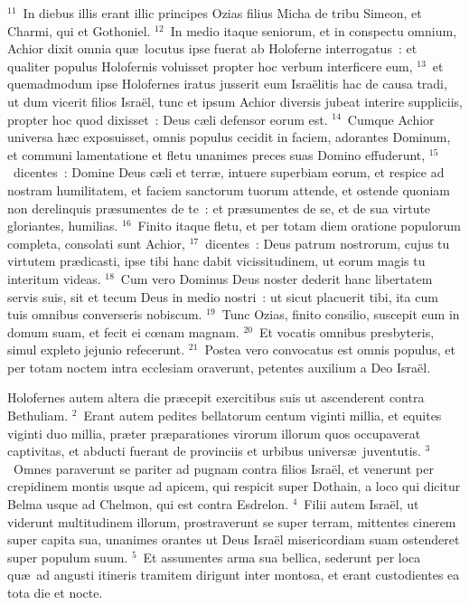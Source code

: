 ${}^{11}$~In diebus illis erant illic principes Ozias filius Micha de tribu Simeon, et Charmi, qui et Gothoniel.
${}^{12}$~In medio itaque seniorum, et in conspectu omnium, Achior dixit omnia qu\ae\ locutus ipse fuerat ab Holoferne interrogatus~: et qualiter populus Holofernis voluisset propter hoc verbum interficere eum,
${}^{13}$~et quemadmodum ipse Holofernes iratus jusserit eum Isra\"elitis hac de causa tradi, ut dum vicerit filios Isra\"el, tunc et ipsum Achior diversis jubeat interire suppliciis, propter hoc quod dixisset~: Deus c\ae li defensor eorum est.
${}^{14}$~Cumque Achior universa h\ae c exposuisset, omnis populus cecidit in faciem, adorantes Dominum, et communi lamentatione et fletu unanimes preces suas Domino effuderunt,
${}^{15}$~dicentes~: Domine Deus c\ae li et terr\ae , intuere superbiam eorum, et respice ad nostram humilitatem, et faciem sanctorum tuorum attende, et ostende quoniam non derelinquis pr\ae sumentes de te~: et pr\ae sumentes de se, et de sua virtute gloriantes, humilias.
${}^{16}$~Finito itaque fletu, et per totam diem oratione populorum completa, consolati sunt Achior,
${}^{17}$~dicentes~: Deus patrum nostrorum, cujus tu virtutem pr\ae dicasti, ipse tibi hanc dabit vicissitudinem, ut eorum magis tu interitum videas.
${}^{18}$~Cum vero Dominus Deus noster dederit hanc libertatem servis suis, sit et tecum Deus in medio nostri~: ut sicut placuerit tibi, ita cum tuis omnibus converseris nobiscum.
${}^{19}$~Tunc Ozias, finito consilio, suscepit eum in domum suam, et fecit ei cœnam magnam.
${}^{20}$~Et vocatis omnibus presbyteris, simul expleto jejunio refecerunt.
${}^{21}$~Postea vero convocatus est omnis populus, et per totam noctem intra ecclesiam oraverunt, petentes auxilium a Deo Isra\"el.

\lettrine[lines=3,image=true,loversize=0.05,lraise=-0.03]{H}{}olofernes autem altera die pr\ae cepit exercitibus suis ut ascenderent contra Bethuliam.
${}^{2}$~Erant autem pedites bellatorum centum viginti millia, et equites viginti duo millia, pr\ae ter pr\ae parationes virorum illorum quos occupaverat captivitas, et abducti fuerant de provinciis et urbibus univers\ae\ juventutis.
${}^{3}$~Omnes paraverunt se pariter ad pugnam contra filios Isra\"el, et venerunt per crepidinem montis usque ad apicem, qui respicit super Dothain, a loco qui dicitur Belma usque ad Chelmon, qui est contra Esdrelon.
${}^{4}$~Filii autem Isra\"el, ut viderunt multitudinem illorum, prostraverunt se super terram, mittentes cinerem super capita sua, unanimes orantes ut Deus Isra\"el misericordiam suam ostenderet super populum suum.
${}^{5}$~Et assumentes arma sua bellica, sederunt per loca qu\ae\ ad angusti itineris tramitem dirigunt inter montosa, et erant custodientes ea tota die et nocte.


